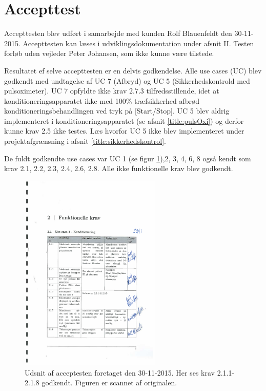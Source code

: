 \section{Accepttest}\label{title:accepttest}
Accepttesten blev udført i samarbejde med kunden Rolf Blauenfeldt den 30-11-2015. Accepttesten kan læses i udviklingsdokumentation under afsnit II. Testen forløb uden vejleder Peter Johansen, som ikke kunne være tilstede.

Resultatet ef selve accepttesten er en delvis godkendelse. Alle use cases (UC) blev godkendt med undtagelse af UC 7 (Afbryd) og UC 5 (Sikkerhedskontrold med pulsoximeter). UC 7 opfyldte ikke krav 2.7.3 tilfredsstillende, idet at konditioneringsapparatet ikke med 100\% træfsikkerhed afbrød konditioneringsbehandlingen ved tryk på [Start/Stop]. UC 5 blev aldrig implementeret i konditioneringsapparatet (se afsnit \ref{title:pulsOxi}) og derfor kunne krav 2.5 ikke testes. Læs hvorfor UC 5 ikke blev implementeret under projektafgrænsning i afsnit \ref{title:sikkerhedskontrol}.

De fuldt godkendte use cases var UC 1 (se figur \ref{fig:udsnitAfAccepttest}),2, 3, 4, 6, 8 også kendt som krav 2.1, 2.2, 2.3, 2.4, 2.6, 2.8. Alle ikke funktionelle krav blev godkendt. 

\begin{figure}[H]
	\centering
	\includegraphics[width=0.6\textwidth]{billeder/udsnitAfAccepttest.pdf}
	\caption{Udsnit af acceptesten foretaget den 30-11-2015. Her ses krav 2.1.1-2.1.8 godkendt. Figuren er scannet af originalen.}\label{fig:udsnitAfAccepttest}
\end{figure}